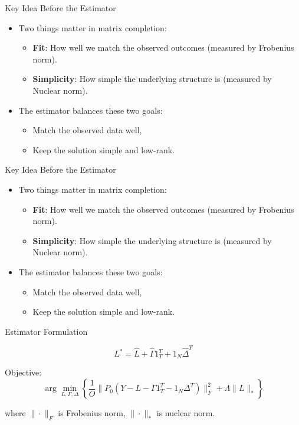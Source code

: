 \documentclass{beamer}
\begin{document}
\begin{frame}{Key Idea Before the Estimator}
\small
\begin{itemize}
  \item Two things matter in matrix completion:
  \begin{itemize}
    \item \textbf{Fit}: How well we match the observed outcomes (measured by Frobenius norm).
    \item \textbf{Simplicity}: How simple the underlying structure is (measured by Nuclear norm).
  \end{itemize}
  \item The estimator balances these two goals:
  \begin{itemize}
    \item Match the observed data well,
    \item Keep the solution simple and low-rank.
  \end{itemize}
\end{itemize}
\end{frame}



\begin{frame}{Key Idea Before the Estimator}
\small
\begin{itemize}
  \item Two things matter in matrix completion:
  \begin{itemize}
    \item \textbf{Fit}: How well we match the observed outcomes (measured by Frobenius norm).
    \item \textbf{Simplicity}: How simple the underlying structure is (measured by Nuclear norm).
  \end{itemize}
  \item The estimator balances these two goals:
  \begin{itemize}
    \item Match the observed data well,
    \item Keep the solution simple and low-rank.
  \end{itemize}
\end{itemize}
\end{frame}



\begin{frame}{Estimator Formulation}
\small

$$L^* = \widehat{L} + \widehat{\Gamma} 1_T^T + 1_N \widehat{\Delta}^T$$
\bigskip

Objective:
$$ \arg\min_{L, \Gamma, \Delta} \left\{ \frac{1}{O} \|P_0(Y - L - \Gamma 1_T^T - 1_N \Delta^T)\|_F^2 + \Lambda \|L\|_* \right\}$$

where $\|\cdot\|_F$ is Frobenius norm, $\|\cdot\|_*$ is nuclear norm.
\end{frame}
\end{document}
